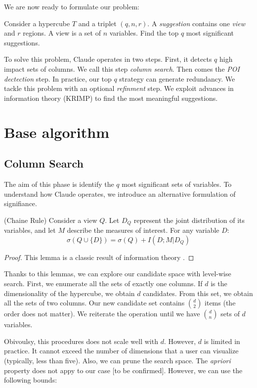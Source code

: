 We are now ready to formulate our problem:
\begin{problem}
Consider a hypercube $T$ and a triplet $(q, n, r)$. A \emph{suggestion}
contains one \emph{view} and $r$ regions. A view is a set of $n$ variables.
Find the top $q$ most significant suggestions.
\end{problem}

To solve this problem, Claude operates in two steps. First, it detects $q$ high
impact sets of columns.  We call this step \emph{column search}.  Then comes
the \emph{POI dectection} step. In practice, our top $q$ strategy can generate
redundancy. We tackle this problem with an optional \emph{refinment} step.  We
exploit advances in information theory (KRIMP) to find the most meaningful
suggestions.


\section{Base algorithm}

\subsection{Column Search}
The aim of this phase is identify the $q$ most significant sets of variables.
To understand how Claude operates, we introduce an alternative formulation of
signifiance.

\begin{lemma}
(Chaine Rule) Consider a view $Q$. Let $D_Q$ represent the joint distribution of
its variables, and let $M$ describe the measures of interest. For any variable $D$: 
$$
    \sigma(Q \cup \{D\}) = \sigma(Q) + I(D ; M | D_Q)
$$
\end{lemma}
\begin{proof}
This lemma is a classic result of information theory \cite{cover2012elements}.
\end{proof}

Thanks to this lemmas, we can explore our candidate space with level-wise
search.  First, we enumerate all the sets of exactly one columns. If $d$ is the
dimensionality of the hypercube,  we obtain $d$ candidates. From this set, we
obtain all the sets of two columns. Our new candidate set contains
$\binom{d}{2}$ items (the order does not matter).  We reiterate the
operation until we have $\binom{d}{n}$ sets of $d$ variables. 

Obivoulsy, this procedures does not scale well with $d$. However, $d$ is
limited in practice. It cannot exceed the number of dimensions that a user can
visualize (typically, less than five). Also, we can prune the search space.
The \emph{apriori} property does not appy to our case [to be
confirmed]. However, we can use the following bounds: 

